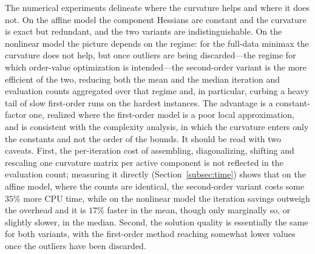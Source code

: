 \documentclass[11pt]{article}
\begin{document}
The numerical experiments delineate where the curvature helps and where it does
not. On the affine model the component Hessians are constant and the curvature
is exact but redundant, and the two variants are indistinguishable. On the nonlinear model the picture
depends on the regime: for the full-data minimax the curvature does not help,
but once outliers are being discarded---the regime for which order-value
optimization is intended---the second-order variant is the more efficient of the
two, reducing both the mean and the median iteration and evaluation counts
aggregated over that regime and, in particular, curbing a heavy tail of slow
first-order runs on the hardest instances. The advantage is a constant-factor one, realized where the
first-order model is a poor local approximation, and is consistent with the
complexity analysis, in which the curvature enters only the constants and not the order of
the bounds. It should be read with two caveats. First, the per-iteration cost of
assembling, diagonalizing, shifting and rescaling one curvature matrix per
active component is not reflected in the evaluation count; measuring it directly
(Section~\ref{subsec:time}) shows that on the affine model, where the counts are
identical, the second-order variant costs some $35\%$ more CPU time, while on
the nonlinear model the iteration savings outweigh the overhead and it is $17\%$
faster in the mean, though only marginally so, or slightly slower, in the
median. Second, the solution quality is essentially the same for both variants,
with the first-order method reaching somewhat lower values once the outliers
have been discarded.
\end{document}
